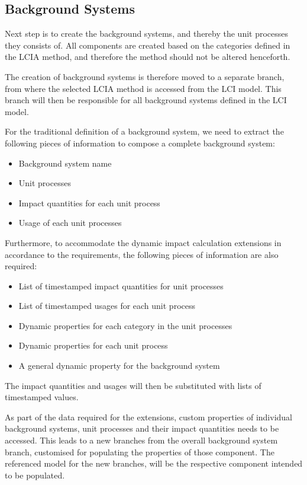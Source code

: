 \subsection{Background Systems} \label{ssec:Design-BackgroundSystems}
Next step is to create the background systems, and thereby the unit processes they consists of. All components are created based on the categories defined in the LCIA method, and therefore the method should not be altered henceforth. 

The creation of background systems is therefore moved to a separate branch, from where the selected LCIA method is accessed from the LCI model. This branch will then be responsible for all background systems defined in the LCI model.

For the traditional definition of a background system, we need to extract the following pieces of information to compose a complete background system:

\begin{itemize}
    \item Background system name
    \item Unit processes
    \item Impact quantities for each unit process
    \item Usage of each unit processes
\end{itemize}

Furthermore, to accommodate the dynamic impact calculation extensions in accordance to the requirements, the following pieces of information are also required:

\begin{itemize}
    \item List of timestamped impact quantities for unit processes
    \item List of timestamped usages for each unit process
    \item Dynamic properties for each category in the unit processes
    \item Dynamic properties for each unit process
    \item A general dynamic property for the background system
\end{itemize}

The impact quantities and usages will then be substituted with lists of timestamped values.

As part of the data required for the extensions, custom properties of individual background systems, unit processes and their impact quantities needs to be accessed. This leads to a new branches from the overall background system branch, customised for populating the properties of those component. The referenced model for the new branches, will be the respective component intended to be populated.

